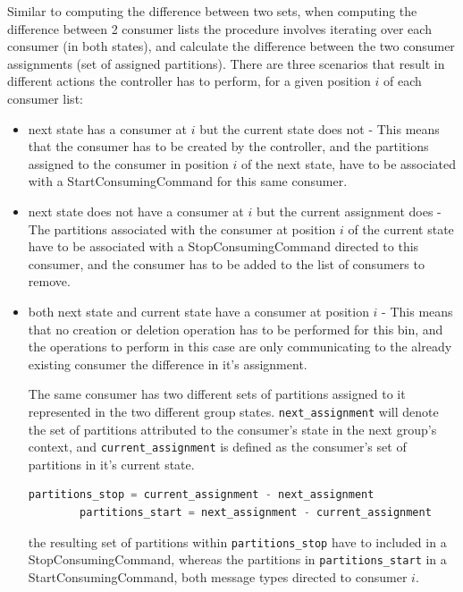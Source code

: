 Similar to computing the difference between two sets, when computing the difference between 2 consumer lists the procedure involves iterating over each consumer (in both states), and calculate the difference between the two consumer assignments (set of assigned partitions). There are three scenarios that result in different actions the controller has to perform, for a given position $i$ of each consumer list:
\begin{itemize}
    \item next state has a consumer at $i$ but the current state does not - This means that the consumer has to be created by the controller, and the partitions assigned to the consumer in position $i$ of the next state, have to be associated with a StartConsumingCommand for this same consumer.
    \item next state does not have a consumer at $i$ but the current assignment does - The partitions associated with the consumer at position $i$ of the current state have to be associated with a StopConsumingCommand directed to this consumer, and the consumer has to be added to the list of consumers to remove. 
    \item both next state and current state have a consumer at position $i$ - This means that no creation or deletion operation has to be performed for this bin, and the operations to perform in this case are only communicating to the already existing consumer the difference in it's assignment. 
    
    The same consumer has two different sets of partitions assigned to it represented in the two different group states. \lstinline[language=Python]{next_assignment} will denote the set of partitions attributed to the consumer's state in the next group's context, and \lstinline[language=Python]{current_assignment} is defined as the consumer's set of partitions in it's current state.
    
    \begin{lstlisting}[language=Python]
        partitions_stop = current_assignment - next_assignment
        partitions_start = next_assignment - current_assignment
    \end{lstlisting}
    the resulting set of partitions within \lstinline[language=Python]{partitions_stop} have to included in a StopConsumingCommand, whereas the partitions in \lstinline[language=Python]{partitions_start} in a StartConsumingCommand, both message types directed to consumer $i$.
\end{itemize}

